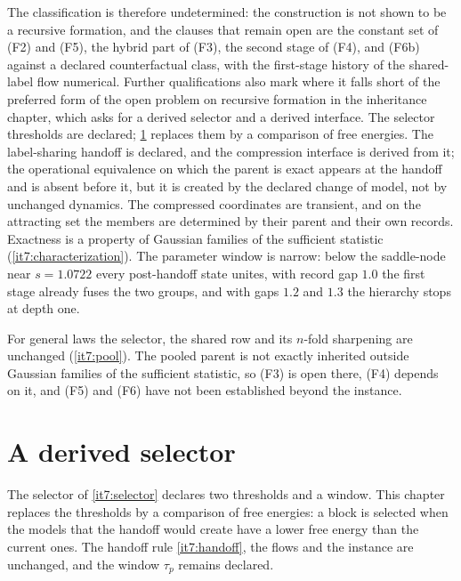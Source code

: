 \documentclass[11pt,letterpaper]{report}
\begin{document}
The classification is therefore undetermined: the construction is not shown to be a recursive formation, and the clauses that remain open are the constant set of (F2) and (F5), the hybrid part of (F3), the second stage of (F4), and (F6b) against a declared counterfactual class, with the first-stage history of the shared-label flow numerical. Further qualifications also mark where it falls short of the preferred form of the open problem on recursive formation in the inheritance chapter, which asks for a derived selector and a derived interface. The selector thresholds are declared; \cref{it7:ch-derived} replaces them by a comparison of free energies. The label-sharing handoff is declared, and the compression interface is derived from it; the operational equivalence on which the parent is exact appears at the handoff and is absent before it, but it is created by the declared change of model, not by unchanged dynamics. The compressed coordinates are transient, and on the attracting set the members are determined by their parent and their own records. Exactness is a property of Gaussian families of the sufficient statistic (\cref{it7:characterization}). The parameter window is narrow: below the saddle-node near $s=1.0722$ every post-handoff state unites, with record gap $1.0$ the first stage already fuses the two groups, and with gaps $1.2$ and $1.3$ the hierarchy stops at depth one.

For general laws the selector, the shared row and its $n$-fold sharpening are unchanged (\cref{it7:pool}). The pooled parent is not exactly inherited outside Gaussian families of the sufficient statistic, so (F3) is open there, (F4) depends on it, and (F5) and (F6) have not been established beyond the instance.

\chapter{A derived selector}
\label{it7:ch-derived}

The selector of \cref{it7:selector} declares two thresholds and a window. This chapter replaces the thresholds by a comparison of free energies: a block is selected when the models that the handoff would create have a lower free energy than the current ones. The handoff rule \cref{it7:handoff}, the flows and the instance are unchanged, and the window $\tau_p$ remains declared.
\end{document}
